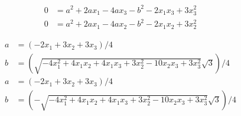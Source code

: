 \begin{align}
  0 & = a^{2}+2 a x_1 - 4 a x_3 - b^{2} - 2 x_1 x_3+3 x_3^{2}  \\
   0 & = a^{2}+2 a x_1 - 4 a x_2 - b^{ 2} - 2 x_1 x_2+3 x_2^{2}  
\end{align}

\begin{align}
   a & =  \left(  - 2 x_1+3 x_2+3 x_3 \right)  / 4  \\
   b & =  \left( \sqrt { - 4 x_1^{2}+4 x_1 x_2+4 x_1  x_3+3 x_2^{2} - 10 x_2 x_3+3 x_3^{2}} \sqrt {3} \right)  / 4   \\
    a & =  \left(  - 2 x_1+3 x_2+ 3 x_3 \right)  / 4  \\
   b & =  \left(  - \sqrt { - 4 x_1^{2}+4 x_1 x_2+4 x_1 x_3+3 x_2^{2} - 10 x_2  x_3+3 x_3^{2}} \sqrt {3} \right)  / 4   
\end{align}
